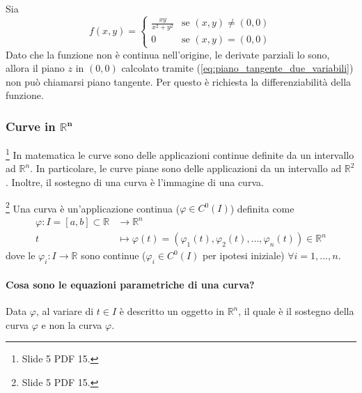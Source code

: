 \begin{example}\label{ex:piano_non_tangente}
	Sia
	\begin{equation*}
		f(x,y)=
		\begin{cases}
			\frac{xy}{x^2+y^2} & \text{se } (x,y)\neq(0,0)\\
			0 &\text{se }(x,y)=(0,0)
		\end{cases}
	\end{equation*}
	Dato che la funzione non è continua nell'origine, le derivate parziali lo sono, allora il piano $z$ in $(0,0)$ calcolato tramite (\ref{eq:piano_tangente_due_variabili}) non può chiamarsi piano tangente. Per questo è richiesta la differenziabilità della funzione.
\end{example}

\subsubsection{Curve in \texorpdfstring{$\boldsymbol{\mathbb R^n}$}{Rn}}\label{ssec:curve_Rn}\footnote{Slide 5 PDF 15.}
In matematica le curve sono delle applicazioni continue definite da un intervallo ad $\mathbb R^n$. In particolare, le curve piane sono delle applicazioni da un intervallo ad $\mathbb R^2$. Inoltre, il sostegno di una curva è l'immagine di una curva.
\begin{definition}\footnote{Slide 5 PDF 15.}
	Una curva è un'applicazione continua ($\varphi\in C^0(I)$) definita come
	\begin{equation}\label{eq:curva}
		\begin{aligned}
			\varphi\colon I=[a,b]\subset\mathbb R & \rightarrow \mathbb R^n\\
			t &\mapsto \varphi(t) = (\varphi_1(t), \varphi_2(t),\hdots, \varphi_n(t))\in\mathbb{R}^n
		\end{aligned}
	\end{equation}
	dove le $\varphi_i:I\rightarrow\mathbb{R}$ sono continue ($\varphi_i\in C^0(I)$ per ipotesi iniziale) $\forall i=1,\hdots,n$.
\end{definition}

\paragraph{Cosa sono le equazioni parametriche di una curva?} Data $\varphi$, al variare di $t\in I$ è descritto un oggetto in $\mathbb{R}^n$, il quale è il sostegno della curva $\varphi$ e non la curva $\varphi$.

